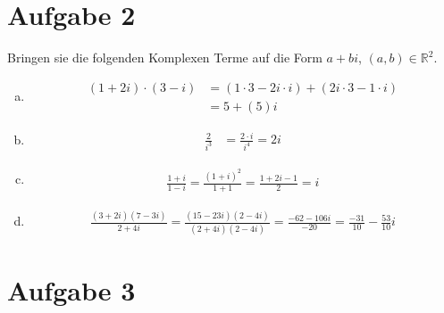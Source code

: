 \documentclass{scrreprt}
\newcommand{\RR}{\mathbb{R}}
\begin{document}
\section*{Aufgabe 2}
Bringen sie die folgenden Komplexen Terme auf die Form $a + b i$, $(a,b) \in \RR^2$.
\begin{enumerate}[(a)]
\item
    \begin{align*}
        (1 + 2i) \cdot (3-i) & = (1 \cdot 3 - 2i \cdot i) + (2i \cdot 3 - 1 \cdot i)\\
        & = 5 + (5)i
    \end{align*}
\item
    \begin{align*}
        \frac{2}{i^3} & = \frac{2\cdot i}{i^4} = 2i
    \end{align*}
\item
    \begin{align*}
        \frac{1+i}{1-i} = \frac{(1+i)^2}{1 + 1} = \frac{1 + 2i - 1}{2} = i
    \end{align*}
\item
    \begin{align*}
        \frac{(3 + 2i)(7 - 3i)}{2 + 4i} = \frac{(15-23i)(2-4i)}{(2+4i)(2-4i)} = \frac{-62 - 106i}{-20} = \frac{-31}{10} - \frac{53}{10}i
    \end{align*}
\end{enumerate}

\section*{Aufgabe 3}
\end{document}
